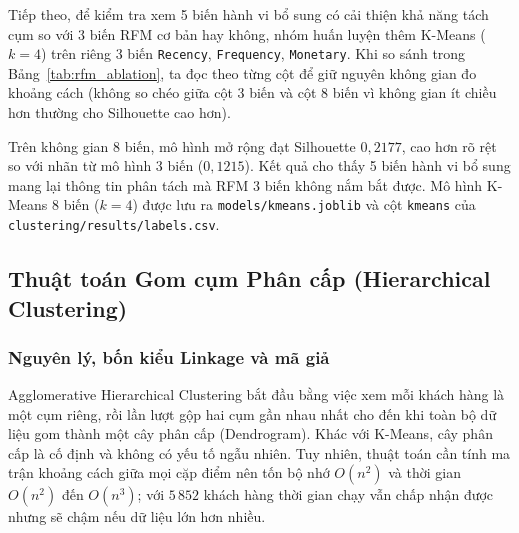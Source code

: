 \documentclass[12pt,a4paper]{article}
\numberwithin{equation}{section}
\numberwithin{table}{section}
\numberwithin{figure}{section}
\begin{document}
Tiếp theo, để kiểm tra xem 5 biến hành vi bổ sung có cải thiện khả năng tách cụm so với 3 biến RFM cơ bản hay không, nhóm huấn luyện thêm K-Means ($k=4$) trên riêng 3 biến \texttt{Recency}, \texttt{Frequency}, \texttt{Monetary}. Khi so sánh trong Bảng~\ref{tab:rfm_ablation}, ta đọc theo từng cột để giữ nguyên không gian đo khoảng cách (không so chéo giữa cột 3 biến và cột 8 biến vì không gian ít chiều hơn thường cho Silhouette cao hơn).

\begin{table}[H]
\centering
\small
{}
\caption{Đối chứng giữa mô hình RFM 3 biến và mô hình mở rộng 8 biến tại $k = 4$.}
\label{tab:rfm_ablation}
\end{table}

Trên không gian 8 biến, mô hình mở rộng đạt Silhouette $0,2177$, cao hơn rõ rệt so với nhãn từ mô hình 3 biến ($0,1215$). Kết quả cho thấy 5 biến hành vi bổ sung mang lại thông tin phân tách mà RFM 3 biến không nắm bắt được. Mô hình K-Means 8 biến ($k = 4$) được lưu ra \texttt{models/kmeans.joblib} và cột \texttt{kmeans} của \texttt{clustering/results/labels.csv}.

\subsection{Thuật toán Gom cụm Phân cấp (Hierarchical Clustering)}

\subsubsection{Nguyên lý, bốn kiểu Linkage và mã giả}

Agglomerative Hierarchical Clustering bắt đầu bằng việc xem mỗi khách hàng là một cụm riêng, rồi lần lượt gộp hai cụm gần nhau nhất cho đến khi toàn bộ dữ liệu gom thành một cây phân cấp (Dendrogram). Khác với K-Means, cây phân cấp là cố định và không có yếu tố ngẫu nhiên. Tuy nhiên, thuật toán cần tính ma trận khoảng cách giữa mọi cặp điểm nên tốn bộ nhớ $O(n^2)$ và thời gian $O(n^2)$ đến $O(n^3)$; với $5\,852$ khách hàng thời gian chạy vẫn chấp nhận được nhưng sẽ chậm nếu dữ liệu lớn hơn nhiều.
\end{document}
